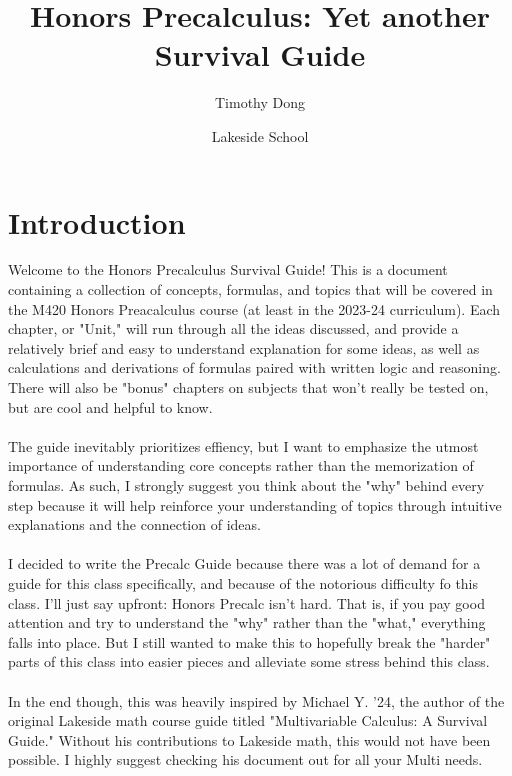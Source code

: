 \documentclass[11pt]{scrartcl}
\begin{document}
\title{Honors Precalculus: Yet another Survival Guide}
\author{Timothy Dong}
\date{Lakeside School}
\maketitle

\tableofcontents

\newpage{}
\section{Introduction}
Welcome to the Honors Precalculus Survival Guide! This is a document containing a collection
of concepts, formulas, and topics that will be covered in the M420 Honors
Preacalculus course (at least in the 2023-24 curriculum). Each chapter, 
or "Unit," will run through all the ideas discussed, and provide a relatively
brief and easy to understand explanation for some ideas, as well as calculations
and derivations of formulas paired with written logic and reasoning. There
will also be "bonus" chapters on subjects that won't really be tested on,
but are cool and helpful to know.
\\\\
The guide inevitably prioritizes effiency, but I want to emphasize the utmost
importance of understanding core concepts rather than the memorization of
formulas. As such, I strongly suggest you think about the "why" behind
every step because it will help reinforce your understanding of topics 
through intuitive explanations and the connection of ideas.
\\\\
I decided to write the Precalc Guide because there was a lot of demand for
a guide for this class specifically, and because of the notorious difficulty 
fo this class. I'll just say upfront: Honors Precalc isn't hard. That is,
if you pay good attention and try to understand the "why" rather than the
"what," everything falls into place. But I still wanted to make this to hopefully
break the "harder" parts of this class into easier pieces and alleviate some
stress behind this class.
\\\\
In the end though, this was heavily inspired by Michael Y. '24, the author
of the original Lakeside math course guide titled "Multivariable Calculus: A Survival Guide."
Without his contributions to Lakeside math, this would not have been possible.
I highly suggest checking his document out for all your Multi needs.
\\\\
\end{document}
